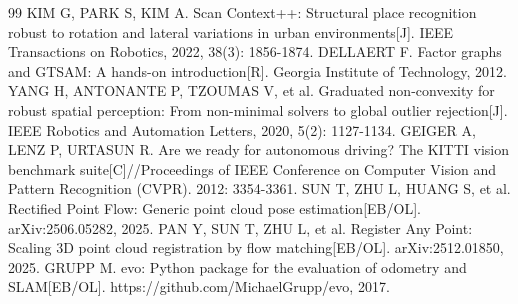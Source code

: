 \documentclass[UTF8,12pt]{ctexart}
\begin{document}
\begin{thebibliography}{99}
 KIM G, PARK S, KIM A. Scan Context++: Structural place recognition robust to rotation and lateral variations in urban environments[J]. IEEE Transactions on Robotics, 2022, 38(3): 1856-1874.
 DELLAERT F. Factor graphs and GTSAM: A hands-on introduction[R]. Georgia Institute of Technology, 2012.
 YANG H, ANTONANTE P, TZOUMAS V, et al. Graduated non-convexity for robust spatial perception: From non-minimal solvers to global outlier rejection[J]. IEEE Robotics and Automation Letters, 2020, 5(2): 1127-1134.
 GEIGER A, LENZ P, URTASUN R. Are we ready for autonomous driving? The KITTI vision benchmark suite[C]//Proceedings of IEEE Conference on Computer Vision and Pattern Recognition (CVPR). 2012: 3354-3361.
 SUN T, ZHU L, HUANG S, et al. Rectified Point Flow: Generic point cloud pose estimation[EB/OL]. arXiv:2506.05282, 2025.
 PAN Y, SUN T, ZHU L, et al. Register Any Point: Scaling 3D point cloud registration by flow matching[EB/OL]. arXiv:2512.01850, 2025.
 GRUPP M. evo: Python package for the evaluation of odometry and SLAM[EB/OL]. https://github.com/MichaelGrupp/evo, 2017.
\end{thebibliography}
\end{document}
